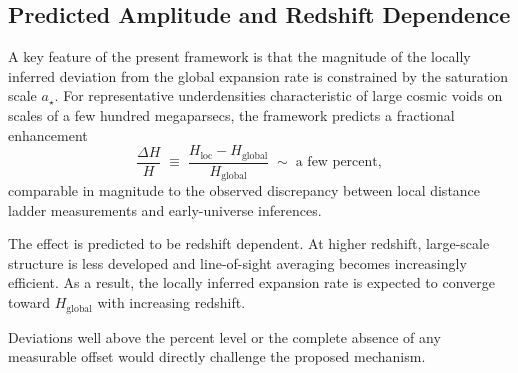 \subsection{Predicted Amplitude and Redshift Dependence}
  \label{subsec:hubble_predictions}

  A key feature of the present framework is that the magnitude of the locally
  inferred deviation from the global expansion rate is constrained by the
  saturation scale \(a_\star\).
  For representative underdensities characteristic of large cosmic voids on
  scales of a few hundred megaparsecs,
  the framework predicts a fractional enhancement
  \begin{equation}
    \frac{\Delta H}{H}
    \;\equiv\;
    \frac{H_{\mathrm{loc}} - H_{\mathrm{global}}}
    {H_{\mathrm{global}}}
    \;\sim\;
    \text{a few percent},
    \label{eq:deltaH}
  \end{equation}
  comparable in magnitude to the observed discrepancy between local distance
  ladder measurements and early-universe inferences.

  The effect is predicted to be redshift dependent.
  At higher redshift, large-scale structure is less developed and line-of-sight
  averaging becomes increasingly efficient.
  As a result, the locally inferred expansion rate is expected to converge toward
  \(H_{\mathrm{global}}\) with increasing redshift.

  Deviations well above the percent level or the complete absence of any measurable
  offset would directly challenge the proposed mechanism.
